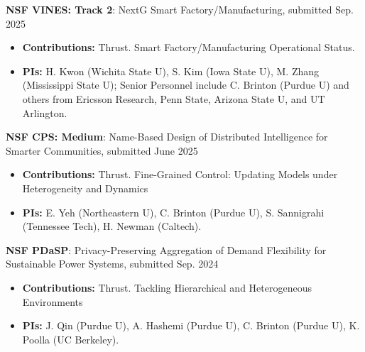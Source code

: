 \documentclass[letterpaper,11pt]{article}
\begin{document}
\vspace{5pt}
\textbf{NSF VINES: Track 2}: {NextG Smart Factory/Manufacturing}, submitted Sep. 2025 
\begin{itemize}[leftmargin=1.5em, topsep=0pt, itemsep=-2pt]
         \item[\textbullet] \textbf{Contributions:} Thrust. Smart Factory/Manufacturing Operational Status.
        \item[\textbullet] \textbf{PIs:}  H. Kwon (Wichita State U), S. Kim (Iowa State U), M. Zhang (Mississippi State U); Senior Personnel include C. Brinton (Purdue U) and others from Ericsson Research, Penn State, Arizona State U, and UT Arlington.
    \end{itemize}
\vspace{0.8em} 
\textbf{NSF CPS: Medium}: {Name-Based Design of Distributed Intelligence for Smarter Communities}, submitted June 2025 
    \begin{itemize}[leftmargin=1.5em, topsep=0pt, itemsep=-2pt]
     \item[\textbullet] \textbf{Contributions:} Thrust. Fine-Grained Control: Updating Models under Heterogeneity and Dynamics
\item[\textbullet] \textbf{PIs:} E. Yeh (Northeastern U), C. Brinton (Purdue U), S. Sannigrahi (Tennessee Tech), H. Newman (Caltech). 
    \end{itemize}
\vspace{0.8em} 
\textbf{NSF PDaSP}: {Privacy-Preserving Aggregation of Demand Flexibility for Sustainable Power Systems}, submitted Sep. 2024 
    \begin{itemize}[leftmargin=1.5em, topsep=0pt, itemsep=-2pt]
    \item[\textbullet] \textbf{Contributions:} Thrust. Tackling Hierarchical and Heterogeneous Environments
\item[\textbullet] \textbf{PIs:} J. Qin (Purdue U), A. Hashemi (Purdue U), C. Brinton (Purdue U), K. Poolla (UC Berkeley).
    \end{itemize}
\end{document}
